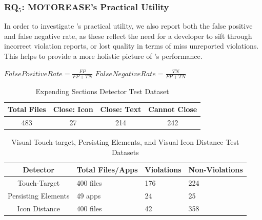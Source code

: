 \subsubsection{RQ$_5$: M{\normalsize OTOR}E{\normalsize ASE}'s Practical Utility}

In order to investigate \MotorEase's practical utility, we also report both the false positive and false negative rate, as these reflect the need for a developer to sift through incorrect violation reports, or lost quality in terms of miss unreported violations. This helps to provide a more holistic picture of \MotorEase's performance.

	\begin{center}$False Positive Rate = \frac{FP}{FP+TN}$ \hspace{1em}$False Negative Rate = \frac{TN}{FP+TN}$\end{center}

\begin{table}[t]
	
	\begin{center}
	\caption{Expending Sections Detector Test Dataset}
	\begin{tabular}{ c|c|c|c } 
		\hline
		\textbf{Total Files} & \textbf{Close: Icon} & \textbf{Close: Text} & \textbf{Cannot Close} \\
		\hline
		483 & 27 & 214 & 242\\ 
		\hline
	\end{tabular}
	\label{t2}
	\end{center}
\end{table}

\begin{table}[t]
	\begin{center}

	\caption{Visual Touch-target, Persisting Elements, and Visual Icon Distance Test Datasets}
	\begin{tabular}{ c|p{.6in}|p{.53in}|p{.5in} } 
		\hline
		\textbf{Detector} & \textbf{Total Files/Apps} & \textbf{Violations} & \textbf{Non-Violations} \\
		\hline
		Touch-Target & 400 files & 176 & 224 \\
		\hline
		Persisting Elements & 49 apps & 24 & 25 \\
		\hline
		Icon Distance & 400 files & 42 & 358 \\
		\hline
		
	\end{tabular}
	\label{t1}
	\end{center}
\end{table}


